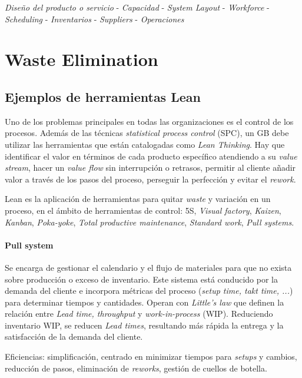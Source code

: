 \documentclass[oneside]{book}
\begin{document}
\begin{center}
\textit{Diseño del producto o servicio} - \textit{Capacidad} - \textit{System Layout} - \textit{Workforce} - \textit{Scheduling} - \textit{Inventarios} - \textit{Suppliers} - \textit{Operaciones}
\end{center}
\section{Waste Elimination}
\subsection{Ejemplos de herramientas Lean}
Uno de los problemas principales en todas las organizaciones es el control de los procesos. Además de las técnicas \textit{statistical process control} (SPC), un GB debe utilizar las herramientas que están catalogadas como \textit{Lean Thinking}. Hay que identificar el valor en términos de cada producto específico atendiendo a su \textit{value stream}, hacer un \textit{value flow} sin interrupción o retrasos, permitir al cliente añadir valor a través de los pasos del proceso, perseguir la perfección y evitar el \textit{rework}.

Lean es la aplicación de herramientas para quitar \textit{waste} y variación en un proceso, en el ámbito de herramientas de control: 5S, \textit{Visual factory}, \textit{Kaizen}, \textit{Kanban}, \textit{Poka-yoke}, \textit{Total productive maintenance}, \textit{Standard work}, \textit{Pull systems}.

\paragraph{Pull system}

Se encarga de gestionar el calendario y el flujo de materiales para que no exista sobre producción o exceso de inventario. Este sistema está conducido por la demanda del cliente e incorpora métricas del proceso (\textit{setup time, takt time, ...}) para determinar tiempos y cantidades. Operan con \textit{Little's law} que definen la relación entre \textit{Lead time, throughput} y \textit{work-in-process} (WIP). Reduciendo inventario WIP, se reducen \textit{Lead times}, resultando más rápida la entrega y la satisfacción de la demanda del cliente.

Eficiencias: simplificación, centrado en minimizar tiempos para \textit{setups} y cambios, reducción de pasos, eliminación de \textit{reworks}, gestión de cuellos de botella.
\end{document}

